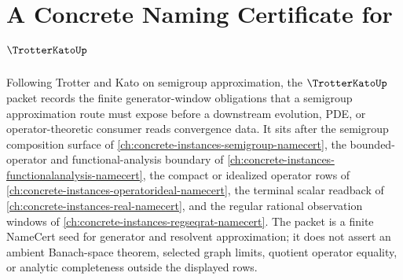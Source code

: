 \chapter{A Concrete Naming Certificate for $\TrotterKatoUp$}
\label{ch:concrete-instances-trotter-kato-namecert}

Following Trotter and Kato on semigroup approximation, the $\TrotterKatoUp$ packet records the finite generator-window obligations that a semigroup approximation route must expose before a downstream evolution, PDE, or operator-theoretic consumer reads convergence data. It sits after the semigroup composition surface of \autoref{ch:concrete-instances-semigroup-namecert}, the bounded-operator and functional-analysis boundary of \autoref{ch:concrete-instances-functionalanalysis-namecert}, the compact or idealized operator rows of \autoref{ch:concrete-instances-operatorideal-namecert}, the terminal scalar readback of \autoref{ch:concrete-instances-real-namecert}, and the regular rational observation windows of \autoref{ch:concrete-instances-regseqrat-namecert}. The packet is a finite NameCert seed for generator and resolvent approximation; it does not assert an ambient Banach-space theorem, selected graph limits, quotient operator equality, or analytic completeness outside the displayed rows.


